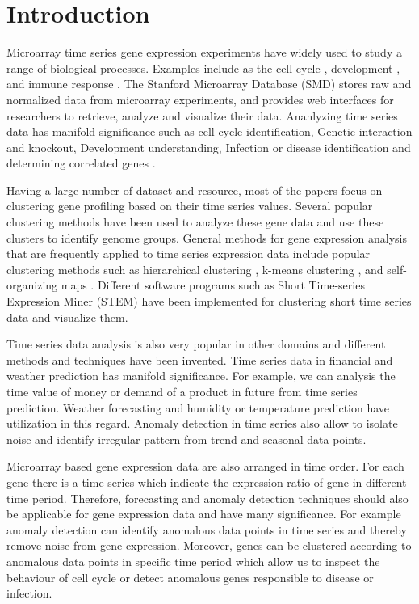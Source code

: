 \section{Introduction}
Microarray time series gene expression experiments have
widely used to study a range of biological processes. Examples include 
as the cell cycle \cite{first}, development \cite{second}, and immune
response \cite{third}. The Stanford Microarray Database (SMD) \cite{fourth} stores raw and normalized data from microarray experiments, and provides web interfaces for researchers to retrieve, analyze and visualize their data. Ananlyzing time series data has manifold significance such as cell cycle identification, Genetic interaction and knockout, Development understanding, Infection or disease identification and determining correlated genes \cite{Coexp}. 




Having a large number of dataset and resource, most of the papers focus on clustering gene profiling  based on their time series values. Several popular clustering methods have been used to analyze these gene data and use these clusters to identify genome groups. General methods
for gene expression analysis that are frequently applied to
time series expression data include popular clustering
methods such as hierarchical clustering \cite{hierarcial}, k-means clustering \cite{knn}, and self-organizing maps \cite{som}. Different software programs such as Short Time-series Expression Miner (STEM) \cite{STEM} have been implemented for clustering short time series data and visualize them. 

Time series data analysis is also very popular in other domains and different methods and techniques have been invented. Time series data in financial \cite{financial time} and weather prediction has manifold significance. For example, we can analysis the time value of money or demand of a product in future from time series prediction. Weather forecasting and humidity or temperature prediction \cite{weather} have utilization in this regard. Anomaly detection in time series also allow to isolate noise and identify irregular pattern  from trend and seasonal data points.

Microarray based gene expression data are also arranged in time order. For each gene there is a time series which indicate the expression ratio of gene in different time period. Therefore, forecasting and anomaly detection techniques should also be applicable for gene expression data and have many significance. For example anomaly detection can identify anomalous data points in time series and thereby remove noise from gene expression. Moreover, genes can be clustered according to anomalous data points in specific time period which allow us to inspect the behaviour of cell cycle or detect anomalous genes responsible to disease or infection. 

